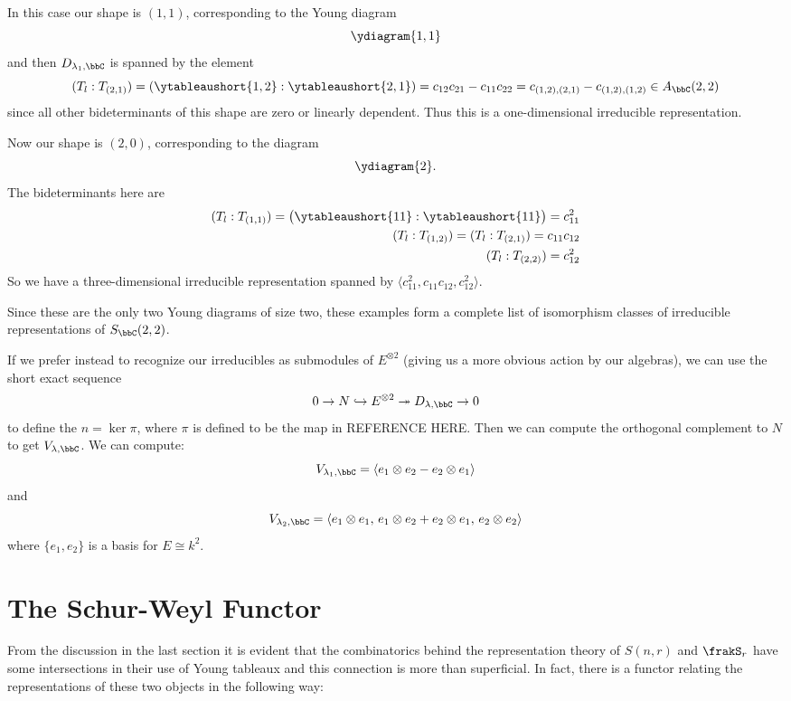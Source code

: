\documentclass[12pt]{article}
\begin{document}
\begin{ex}[$\mathbf{\lambda_1=(1,1)}$]
 In this case our shape is $(1,1)$, corresponding to the Young diagram 
\[\ydiagram{1,1}\]
and then $D_{\lambda_1,\bbC}$ is spanned by the element
\[(T_l:T_{(2,1)})=\left(\ytableaushort{1,2}:\ytableaushort{2,1}\right)=c_{12}c_{21}-c_{11}c_{22}=c_{(1,2),(2,1)}-c_{(1,2),(1,2)}\in A_\bbC(2,2)\]
since all other bideterminants of this shape are zero or linearly dependent. Thus this is a one-dimensional irreducible representation.
\end{ex}
\begin{ex}[$\mathbf{\lambda_2=(2,0)}$]
Now our shape is $(2,0)$, corresponding to the diagram
\[\ydiagram{2}.\]
The bideterminants here are 
\begin{align*}
	(T_l:T_{(1,1)})=\big(\ytableaushort{1 1}:\ytableaushort{1 1}\big)=c_{11}^2\\
	(T_l:T_{(1,2)})=(T_l:T_{(2,1)})=c_{11}c_{12}\\
	(T_l:T_{(2,2)})=c_{12}^2
\end{align*}
So we have a three-dimensional irreducible representation spanned by $\langle c_{11}^2,c_{11}c_{12},c_{12}^2\rangle$.
\end{ex}
Since these are the only two Young diagrams of size two, these examples form a complete list of isomorphism classes of irreducible representations of $S_\bbC(2,2)$.

If we prefer instead to recognize our irreducibles as submodules of $E^{\otimes 2}$ (giving us a more obvious action by our algebras), 
we can use the short exact sequence 
\[0\to N\hookrightarrow E^{\otimes 2}\twoheadrightarrow D_{\lambda,\bbC}\to 0\]
to define the $n=\ker\pi$, where $\pi$ is defined to be the map in REFERENCE HERE. Then we can compute the orthogonal complement to $N$ to get $V_{\lambda,\bbC}$.
We can compute:
\[V_{\lambda_1,\bbC}=\langle e_1\otimes e_2-e_2\otimes e_1\rangle\]
and
\[V_{\lambda_2,\bbC}=\langle e_1\otimes e_1, \,e_1\otimes e_2+e_2\otimes e_1, \,e_2\otimes e_2\rangle\]
where $\{e_1,e_2\}$ is a basis for $E\cong k^2$.





\newpage
\section{The Schur-Weyl Functor}
From the discussion in the last section it is evident that the combinatorics behind the representation theory of $S(n,r)$ and $\frakS_r$ have some intersections
in their use of Young tableaux and this connection is more than superficial. In fact, there is a functor relating the representations
of these two objects in the following way:
\end{document}
